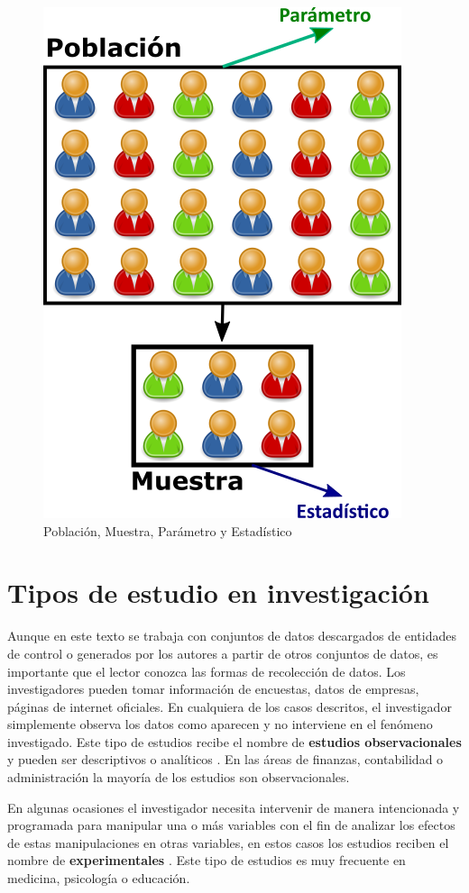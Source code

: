 \documentclass[letterpaper,]{book}
\begin{document}
\begin{figure}[h!]

{\centering \includegraphics[width=0.5\linewidth]{popsample} 

}

\caption{Población, Muestra, Parámetro y Estadístico}\label{fig:popsample}
\end{figure}

\hypertarget{tipos-de-estudio-en-investigacion}{%
\section{Tipos de estudio en investigación}\label{tipos-de-estudio-en-investigacion}}

Aunque en este texto se trabaja con conjuntos de datos descargados de entidades de control o generados por los autores a partir de otros conjuntos de datos, es importante que el lector conozca las formas de recolección de datos. Los investigadores pueden tomar información de encuestas, datos de empresas, páginas de internet oficiales. En cualquiera de los casos descritos, el investigador simplemente observa los datos como aparecen y no interviene en el fenómeno investigado. Este tipo de estudios recibe el nombre de \textbf{estudios observacionales} y pueden ser descriptivos o analíticos \citep{delafuente08}. En las áreas de finanzas, contabilidad o administración la mayoría de los estudios son observacionales.

En algunas ocasiones el investigador necesita intervenir de manera intencionada y programada para manipular una o más variables con el fin de analizar los efectos de estas manipulaciones en otras variables, en estos casos los estudios reciben el nombre de \textbf{experimentales} \citep{miggen07}. Este tipo de estudios es muy frecuente en medicina, psicología o educación.
\end{document}
